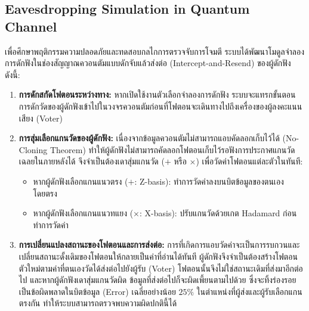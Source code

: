 \subsection{Eavesdropping Simulation in Quantum Channel}
เพื่อศึกษาพฤติกรรมความปลอดภัยและทดสอบกลไกการตรวจจับการโจมตี ระบบได้พัฒนาโมดูลจำลองการดักฟังในช่องสัญญาณควอนตัมแบบดักจับแล้วส่งต่อ (Intercept-and-Resend) ของผู้ดักฟังดังนี้:
\begin{enumerate}
    \item \textbf{การดักสกัดโฟตอนระหว่างทาง:} หากเปิดใช้งานตัวเลือกจำลองการดักฟัง ระบบจะแทรกขั้นตอนการดักวัดของผู้ดักฟังเข้าไปในวงจรควอนตัมก่อนที่โฟตอนจะเดินทางไปถึงเครื่องของผู้ลงคะแนนเสียง (Voter)
    \item \textbf{การสุ่มเลือกแกนวัดของผู้ดักฟัง:} เนื่องจากข้อมูลควอนตัมไม่สามารถแอบคัดลอกเก็บไว้ได้ (No-Cloning Theorem) ทำให้ผู้ดักฟังไม่สามารถคัดลอกโฟตอนเก็บไว้รอฟังการประกาศแกนวัดเฉลยในภายหลังได้ จึงจำเป็นต้องเดาสุ่มแกนวัด ($+$ หรือ $\times$) เพื่อวัดค่าโฟตอนแต่ละตัวในทันที:
    \begin{itemize}
        \item หากผู้ดักฟังเลือกแกนแนวตรง ($+$: Z-basis): ทำการวัดค่าลงบนบิตข้อมูลของตนเองโดยตรง
        \item หากผู้ดักฟังเลือกแกนแนวทแยง ($\times$: X-basis): ปรับแกนวัดด้วยเกต Hadamard ก่อนทำการวัดค่า
    \end{itemize}
    \item \textbf{การเปลี่ยนแปลงสถานะของโฟตอนและการส่งต่อ:} การที่เกิดการแอบวัดค่าจะเป็นการรบกวนและเปลี่ยนสถานะดั้งเดิมของโฟตอนให้กลายเป็นค่าที่อ่านได้ทันที ผู้ดักฟังจึงจำเป็นต้องสร้างโฟตอนตัวใหม่ตามค่าที่ตนเองวัดได้ส่งต่อไปยังผู้รับ (Voter) โฟตอนนั้นจึงไม่ใช่สถานะเดิมที่ส่งมาอีกต่อไป และหากผู้ดักฟังเดาสุ่มแกนวัดผิด ข้อมูลที่ส่งต่อไปก็จะผิดเพี้ยนตามไปด้วย ซึ่งจะทิ้งร่องรอยเป็นข้อผิดพลาดในบิตข้อมูล (Error) เฉลี่ยอย่างน้อย $25\%$ ในตำแหน่งที่ผู้ส่งและผู้รับเลือกแกนตรงกัน ทำให้ระบบสามารถตรวจพบความผิดปกตินี้ได้
\end{enumerate}

